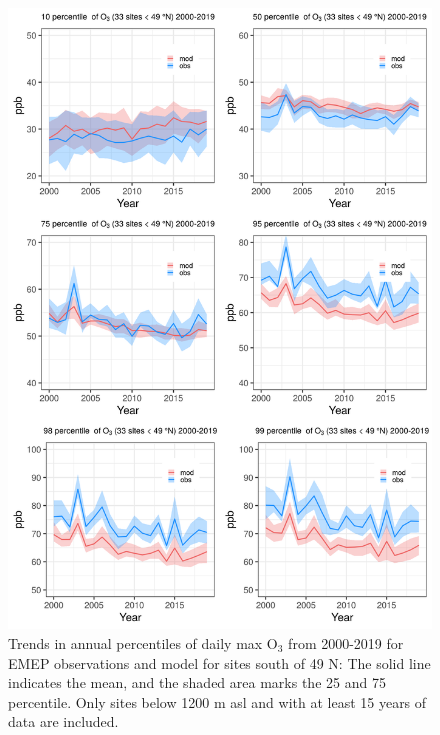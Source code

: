 \begin{figure}
	\centering
	\includegraphics[width=0.74\paperwidth]{FIGS_TRENDS/alltrends_south_49_2000_2019_1200m.png}
	\caption{\label{fig:O3_perctrends_S}Trends in annual percentiles of daily max O$_3$ from 2000-2019 for EMEP observations and model for sites south of 49 N: The solid line indicates the mean, and the shaded area marks the 25 and 75 percentile. Only sites below 1200 m asl and with at least 15 years of data are included.}
\end{figure}


